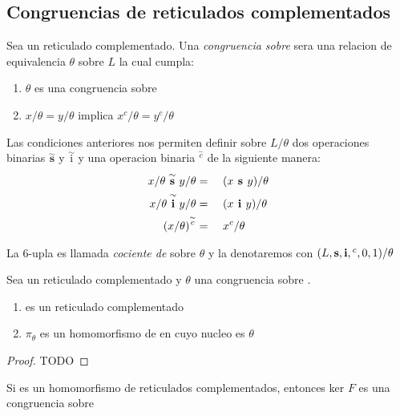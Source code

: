   \subsection{Congruencias de reticulados complementados}
  \begin{definition}
    Sea \reticulCompl un reticulado complementado. Una \emph{congruencia sobre} \reticulCompl sera una
    relacion de equivalencia $\theta$ sobre $L$ la cual cumpla: 
    \begin{enumerate}
      \item $\theta$ es una congruencia sobre \reticulAcot
      \item $x/\theta = y/\theta$ implica $x^c/\theta = y^c/\theta$
    \end{enumerate}

    Las condiciones anteriores nos permiten definir sobre $L/\theta$ dos operaciones binarias $\overset{\sim}{\textbf{s}}$ y $\overset{\sim}{\text{i}}$
    y una operacion binaria ${}^{\overset{\sim}{c}}$ de la siguiente manera:
    \begin{alignat*}{3}
      x/\theta\overset{\sim}{\textbf{ s }}y/\theta &=&\ & (x\textbf{ s }y)/\theta\\
      x/\theta\overset{\sim}{\textbf{ i }}y/\theta &=&\ & (x\textbf{ i }y)/\theta\\
      (x/\theta)^{\overset{\sim}{c}} &=&\ & x^c/\theta
    \end{alignat*}

    La 6-upla  es llamada
    \emph{cociente de} \reticulCompl sobre $\theta$ y la denotaremos con $(L, \textbf{s}, \textbf{i}, {}^c, 0, 1)/\theta$
  \end{definition}

  \begin{lemma}
    Sea \reticulCompl un reticulado complementado y $\theta$ una congruencia sobre \reticulCompl.
    \begin{enumerate}
      \item {} es un reticulado complementado
      \item $\pi_\theta$ es un homomorfismo de \reticulCompl en  cuyo nucleo es $\theta$
    \end{enumerate}
  \end{lemma}
  \begin{proof}
    TODO
  \end{proof}

  \begin{lemma}
    Si  es un homomorfismo de
    reticulados complementados, entonces ker $F$ es una congruencia sobre \reticulCompl
  \end{lemma}
  \noproof

